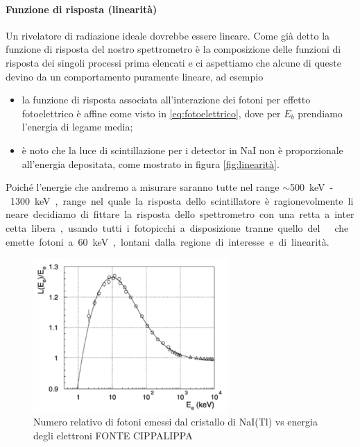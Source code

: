  \paragraph{Funzione di risposta (linearità)}
 Un rivelatore di radiazione ideale dovrebbe essere lineare. Come già detto la funzione di risposta del nostro spettrometro è la composizione delle funzioni di risposta dei singoli processi prima elencati e ci aspettiamo che alcune di queste devino da un comportamento puramente lineare, ad esempio
 \begin{itemize}
 	\item la funzione di risposta associata all'interazione dei fotoni per effetto fotoelettrico è affine come visto in \autoref{eq:fotoelettrico}, dove per $E_b$ prendiamo l'energia di legame media;
 	\item è noto che la luce di scintillazione per i detector in NaI non è proporzionale all'energia depositata, come mostrato in figura \autoref{fig:linearità}.
 \end{itemize}
 Poiché l'energie che andremo a misurare saranno tutte nel range $\sim$\SI{500}keV-\SI{1300}{keV}, range nel quale la risposta dello scintillatore è ragionevolmente lineare decidiamo di fittare la risposta dello spettrometro con una retta a intercetta libera, usando tutti i fotopicchi a disposizione tranne quello del \am\; che emette fotoni a \SI{60}keV, lontani dalla regione di interesse e di linearità.
 
 \begin{figure}[h]
	\centering
	\includegraphics[width=20em]{linearita}
	\caption{\label{fig:linearità}Numero relativo di fotoni emessi dal cristallo di NaI(Tl) vs energia degli elettroni FONTE CIPPALIPPA}
 \end{figure}
 
